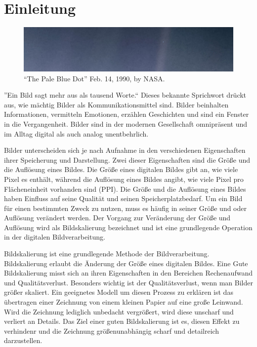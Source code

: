 



\chapter{Einleitung}

\begin{center}
    \begin{figure}[h]
        \includegraphics[width=\textwidth]{img/PIA23645_PaleBlueDotRevisited_1600.jpg}
        \caption{``The Pale Blue Dot'' Feb. 14, 1990, by NASA\footnotemark.}
        \label{fig:my_label}
    \end{figure}
\end{center}

''Ein Bild sagt mehr aus als tausend Worte.`` Dieses bekannte Sprichwort drückt aus, wie mächtig Bilder als Kommunikationsmittel sind.
Bilder beinhalten Informationen, vermitteln Emotionen, erzählen Geschichten und sind ein Fenster in die Vergangenheit.
Bilder sind in der modernen Gesellschaft omnipräsent und im Alltag digital als auch analog unentbehrlich.

Bilder unterscheiden sich je nach Aufnahme in den verschiedenen Eigenschaften ihrer Speicherung und Darstellung.
Zwei dieser Eigenschaften sind die Größe und die Auflösung eines Bildes.
Die Größe eines digitalen Bildes gibt an, wie viele Pixel es enthält, während die Auflösung eines Bildes angibt, wie viele Pixel pro Flächeneinheit vorhanden sind (PPI). %
Die Größe und die Auflösung eines Bildes haben Einfluss auf seine Qualität und seinen Speicherplatzbedarf.
Um ein Bild für einen bestimmten Zweck zu nutzen, muss es häufig in seiner Größe und oder Auflösung verändert werden.
Der Vorgang zur Veränderung der Größe und Auflösung wird als Bildskalierung bezeichnet und ist eine grundlegende Operation in der digitalen Bildverarbeitung.

Bildskalierung ist eine grundlegende Methode der Bildverarbeitung. Bildskalierung erlaubt die Änderung der Größe eines digitalen Bildes.
Eine Gute Bildskalierung misst sich an ihren Eigenschaften in den Bereichen Rechenaufwand und Qualitätsverlust.
Besonders wichtig ist der Qualitätsverlust, wenn man Bilder größer skaliert.
Ein geeignetes Modell um diesen Prozess zu erklären ist das übertragen einer Zeichnung von einem kleinen Papier auf eine große Leinwand.
Wird die Zeichnung lediglich unbedacht vergrößert, wird diese unscharf und verliert an Details.
Das Ziel einer guten Bildskalierung ist es, diesen Effekt zu verhindenr und die Zeichnung größenunabhängig scharf und detailreich darzustellen.

